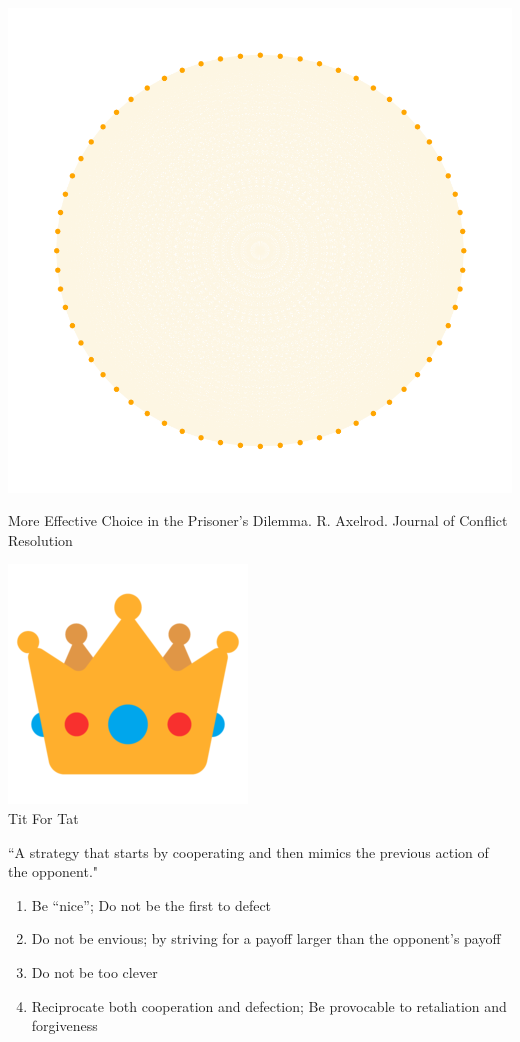 \documentclass{beamer}
\begin{document}
\begin{frame}
    \begin{center}
    \includegraphics[width=.75\textwidth]{static/second_tournament}\\
    \vspace{1cm}

    \tiny{More Effective Choice in the Prisoner's Dilemma. R. Axelrod. Journal of Conflict Resolution}
    \end{center}
\end{frame}

\begin{frame}
    \begin{center}
        \includegraphics[width=.09\textwidth]{static/crown.png} \\
        \Large{Tit For Tat} \\
        \vspace{1cm}

        \small{``A strategy that starts by cooperating and then mimics the previous action of the opponent."}
    \end{center}
\end{frame}

\begin{frame}
    \begin{enumerate}
        \item Be ``nice''; Do not be the first to defect
        \item Do not be envious; by striving for a payoff larger than the opponent's payoff
        \item Do not be too clever
        \item Reciprocate both cooperation and defection; Be provocable to retaliation and forgiveness
    \end{enumerate}
\end{frame}
\end{document}
